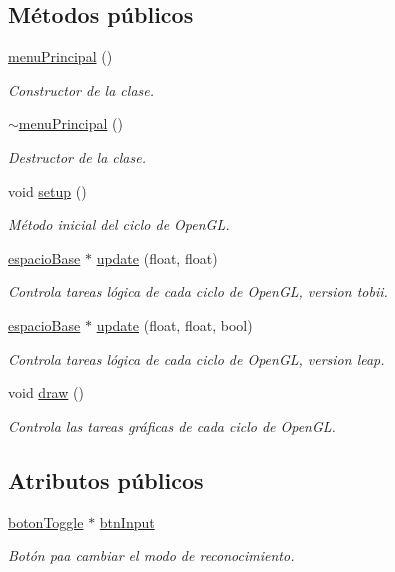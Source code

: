 \subsection*{Métodos públicos}
\begin{DoxyCompactItemize}
\item 
\hyperlink{classmenu_principal_a28bc45a9592e32d48979bb34b5e937b5}{menu\+Principal} ()
\begin{DoxyCompactList}\small\item\em Constructor de la clase. \end{DoxyCompactList}\item 
\hyperlink{classmenu_principal_aec2f0d44f0cd26e5c9ddfea5141ba0a1}{$\sim$menu\+Principal} ()
\begin{DoxyCompactList}\small\item\em Destructor de la clase. \end{DoxyCompactList}\item 
void \hyperlink{classmenu_principal_af392d4bbd2d1851b565441ed9dccbae8}{setup} ()
\begin{DoxyCompactList}\small\item\em Método inicial del ciclo de Open\+G\+L. \end{DoxyCompactList}\item 
\hyperlink{classespacio_base}{espacio\+Base} $\ast$ \hyperlink{classmenu_principal_a92b6834ff602085f79bb16f39c6a45cd}{update} (float, float)
\begin{DoxyCompactList}\small\item\em Controla tareas lógica de cada ciclo de Open\+G\+L, version tobii. \end{DoxyCompactList}\item 
\hyperlink{classespacio_base}{espacio\+Base} $\ast$ \hyperlink{classmenu_principal_a74169588b3f34d0eec40f0d749a7f03f}{update} (float, float, bool)
\begin{DoxyCompactList}\small\item\em Controla tareas lógica de cada ciclo de Open\+G\+L, version leap. \end{DoxyCompactList}\item 
void \hyperlink{classmenu_principal_ac76c28146574b4b72364cb877b5cd83f}{draw} ()
\begin{DoxyCompactList}\small\item\em Controla las tareas gráficas de cada ciclo de Open\+G\+L. \end{DoxyCompactList}\end{DoxyCompactItemize}
\subsection*{Atributos públicos}
\begin{DoxyCompactItemize}
\item 
\hyperlink{classboton_toggle}{boton\+Toggle} $\ast$ \hyperlink{classmenu_principal_aea487ca8d9e0d1df2fda6a563ca0f04c}{btn\+Input}
\begin{DoxyCompactList}\small\item\em Botón paa cambiar el modo de reconocimiento. \end{DoxyCompactList}\end{DoxyCompactItemize}
